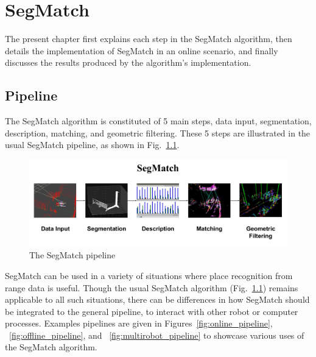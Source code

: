 \chapter{SegMatch}
\label{chap:segmatch}

The present chapter first explains each step in the SegMatch algorithm, then details the implementation of SegMatch in an online scenario, and finally discusses the results produced by the algorithm's implementation.

\section{Pipeline}
\label{sec:intro-pipeline}
The SegMatch algorithm is constituted of 5 main steps, data input, segmentation, description, matching, and geometric filtering. These 5 steps are illustrated in the usual SegMatch pipeline, as shown in Fig.~\ref{fig:pipeline}.\\

\begin{figure}
  \centering
  \includegraphics[width=5.2in]{images/pipeline.pdf}
  \caption{The SegMatch pipeline}
  \label{fig:pipeline}
\end{figure}

SegMatch can be used in a variety of situations where place recognition from range data is useful. Though the usual SegMatch algorithm (Fig.~\ref{fig:pipeline}) remains applicable to all such situations, there can be differences in how SegMatch should be integrated to the general pipeline, to interact with other robot or computer processes. Examples pipelines are given in Figures~\ref{fig:online_pipeline}, ~\ref{fig:offline_pipeline}, and ~\ref{fig:multirobot_pipeline} to showcase various uses of the SegMatch algorithm.\\

